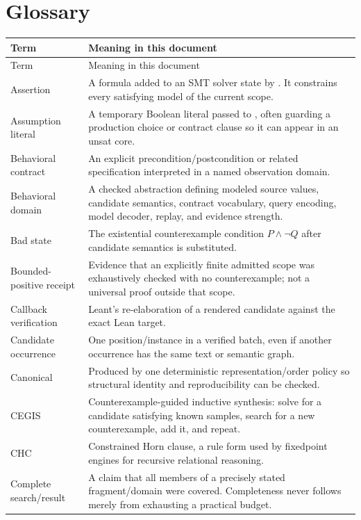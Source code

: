 \documentclass[10pt,letterpaper,oneside]{report}
\newcommand{\code}[1]{\texttt{\detokenize{#1}}}
\begin{document}
\chapter{Glossary}
\label{app:glossary}

\begin{longtable}{@{}L{0.23\textwidth}L{0.71\textwidth}@{}}
\toprule
Term & Meaning in this document \\
\midrule
\endfirsthead
\toprule
Term & Meaning in this document \\
\midrule
\endhead
\bottomrule
\endfoot
Assertion & A formula added to an SMT solver state by \code{assert}. It constrains every satisfying model of the current scope. \\
Assumption literal & A temporary Boolean literal passed to \code{check-sat-assuming}, often guarding a production choice or contract clause so it can appear in an unsat core. \\
Behavioral contract & An explicit precondition/postcondition or related specification interpreted in a named observation domain. \\
Behavioral domain & A checked abstraction defining modeled source values, candidate semantics, contract vocabulary, query encoding, model decoder, replay, and evidence strength. \\
Bad state & The existential counterexample condition $P\land\neg Q$ after candidate semantics is substituted. \\
Bounded-positive receipt & Evidence that an explicitly finite admitted scope was exhaustively checked with no counterexample; not a universal proof outside that scope. \\
Callback verification & Leant's re-elaboration of a rendered candidate against the exact Lean target. \\
Candidate occurrence & One position/instance in a verified batch, even if another occurrence has the same text or semantic graph. \\
Canonical & Produced by one deterministic representation/order policy so structural identity and reproducibility can be checked. \\
CEGIS & Counterexample-guided inductive synthesis: solve for a candidate satisfying known samples, search for a new counterexample, add it, and repeat. \\
CHC & Constrained Horn clause, a rule form used by fixedpoint engines for recursive relational reasoning. \\
Complete search/result & A claim that all members of a precisely stated fragment/domain were covered. Completeness never follows merely from exhausting a practical budget. \\

\end{longtable}
\end{document}
